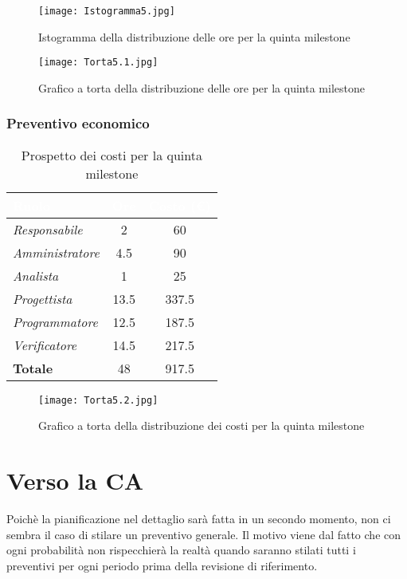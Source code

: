 \begin{figure}[H]
    \texttt{[image: Istogramma5.jpg]}
    \caption{Istogramma della distribuzione delle ore per la quinta milestone}
\end{figure}

\begin{figure}[H]
    \texttt{[image: Torta5.1.jpg]}
    \caption{Grafico a torta della distribuzione delle ore per la quinta milestone}
\end{figure}

\newpage
\subsubsection{Preventivo economico}

\begin{table}[H]
    \renewcommand\arraystretch{1.5}
    \centering
    \begin{tabular}{|l|c|c|}
    \hline
    \rowcolor[HTML]{036400}
    \textcolor{white}{\textbf{Ruolo}} & \multicolumn{1}{l|}{\textcolor{white}{\textbf{Ore}}} & \multicolumn{1}{l|}{\textcolor{white}{\textbf{Costo (€)}}} \\ \hline
    \rowcolor[HTML]{EFEFEF}\textit{Responsabile}   & 2    & 60     \\ \hline
    \rowcolor[HTML]{C0C0C0}\textit{Amministratore} & 4.5  & 90     \\ \hline
    \rowcolor[HTML]{EFEFEF}\textit{Analista}       & 1    & 25     \\ \hline
    \rowcolor[HTML]{C0C0C0}\textit{Progettista}    & 13.5 & 337.5  \\ \hline
    \rowcolor[HTML]{EFEFEF}\textit{Programmatore}  & 12.5 & 187.5  \\ \hline
    \rowcolor[HTML]{C0C0C0}\textit{Verificatore}   & 14.5 & 217.5  \\ \hline
    \rowcolor[HTML]{EFEFEF}\textbf{Totale}         & 48   & 917.5  \\ \hline
    \end{tabular}
    \caption{Prospetto dei costi per la quinta milestone}
\end{table}

\begin{figure}[H]
    \texttt{[image: Torta5.2.jpg]}
    \caption{Grafico a torta della distribuzione dei costi per la quinta milestone}
\end{figure}

\newpage
\section{Verso la CA}

Poichè la pianificazione nel dettaglio sarà fatta in un secondo momento, non ci sembra il caso di stilare un preventivo generale. Il motivo viene dal fatto che con ogni probabilità non rispecchierà la realtà quando saranno stilati tutti i preventivi per ogni periodo prima della revisione di riferimento.
